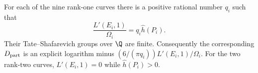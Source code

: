 \begin{proposition}\label{ari:C.6.R3}
For each of the nine rank-one curves there is a positive rational
number $q_i$ such that
\begin{equation}\label{ari:eq:Cr-rational-factor}
 \frac{L'(E_i,1)}{\Omega_i}=q_i\widehat h(P_i).
\end{equation}
Their Tate--Shafarevich groups over $\Q$ are finite. Consequently
the corresponding $D_{\rm part}$ is an explicit logarithm minus
$(6/(\pi q_i))L'(E_i,1)/\Omega_i$. For the two rank-two curves, $L'(E_i,1)=0$ while
$\widehat h(P_i)>0$.
\end{proposition}

